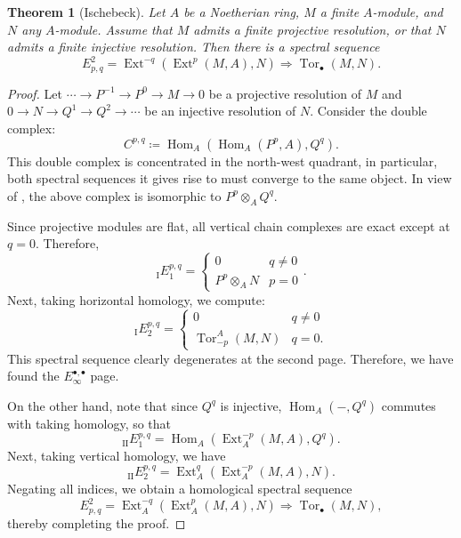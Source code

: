 \documentclass[11pt]{article}
\theoremstyle{thmstyle}
\newtheorem{theorem}{Theorem}
\theoremstyle{defstyle}
\newcommand{\Tor}{\operatorname{Tor}}
\newcommand{\Hom}{\operatorname{Hom}}
\newcommand{\Ext}{\operatorname{Ext}}
\begin{document}
\begin{theorem}[Ischebeck]
    Let $A$ be a Noetherian ring, $M$ a finite $A$-module, and $N$ any $A$-module. Assume that $M$ admits a finite projective resolution, or that $N$ admits a finite injective resolution. Then there is a spectral sequence 
    \begin{equation*}
        E^2_{p, q} = \Ext^{-q}\left(\Ext^p(M, A), N\right)\Longrightarrow\Tor_\bullet(M, N).
    \end{equation*}
\end{theorem}
\begin{proof}
    Let $\cdots\to P^{-1}\to P^0\to M\to 0$ be a projective resolution of $M$ and $0\to N\to Q^1\to Q^2\to\cdots$ be an injective resolution of $N$. Consider the double complex: 
    \begin{equation*}
        C^{p, q}\coloneq\Hom_A(\Hom_A(P^p, A), Q^q).
    \end{equation*}
    This double complex is concentrated in the north-west quadrant, in particular, both spectral sequences it gives rise to must converge to the same object. In view of , the above complex is isomorphic to $P^p\otimes_A Q^q$. 

    Since projective modules are flat, all vertical chain complexes are exact except at $q = 0$. Therefore, 
    \begin{equation*}
        {}_{\mathrm I}E^{p, q}_1 = 
        \begin{cases}
            0 & q\ne 0\\
            P^p\otimes_A N & p = 0
        \end{cases}.
    \end{equation*}
    Next, taking horizontal homology, we compute: 
    \begin{equation*}
        {}_{\mathrm I}E^{p, q}_2 = 
        \begin{cases}
            0 & q\ne 0\\
            \Tor^A_{-p}(M, N) & q = 0.
        \end{cases}
    \end{equation*}
    This spectral sequence clearly degenerates at the second page. Therefore, we have found the $E_\infty^{\bullet,\bullet}$ page.

    On the other hand, note that since $Q^q$ is injective, $\Hom_A(-, Q^q)$ commutes with taking homology, so that 
    \begin{equation*}
        {}_{\mathrm{II}} E^{p, q}_{1} = \Hom_A\left(\Ext^{-p}_A(M, A), Q^q\right).
    \end{equation*}
    Next, taking vertical homology, we have 
    \begin{equation*}
        {}_{\mathrm{II}}E^{p, q}_{2} = \Ext^q_A\left(\Ext^{-p}_A(M, A), N\right).
    \end{equation*}
    Negating all indices, we obtain a homological spectral sequence 
    \begin{equation*}
        E^2_{p, q} = \Ext^{-q}_A\left(\Ext^p_A(M, A), N\right)\Longrightarrow\Tor_{\bullet}(M, N),
    \end{equation*}
    thereby completing the proof. \qedhere
\end{proof}
\end{document}
